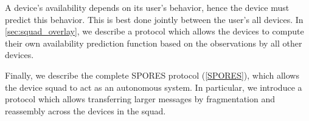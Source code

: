 A device's availability depends on its user's behavior, hence the device must 
predict this behavior.
This is best done jointly between the user's all devices.
In \cref{sec:squad_overlay}, we describe a protocol which allows the devices to 
compute their own availability prediction function based on the observations by 
all other devices.

Finally, we describe the complete \ac{SPORES} protocol (\cref{SPORES}), which 
allows the device squad to act as an autonomous system.
In particular, we introduce a protocol which allows transferring larger 
messages by fragmentation and reassembly across the devices in the squad.




%
